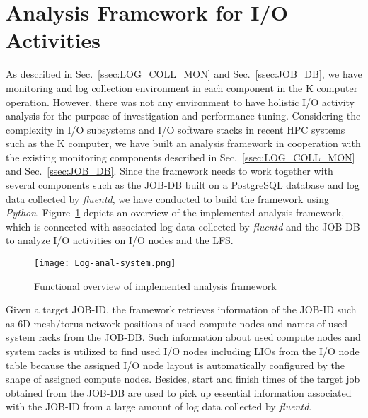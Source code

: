 \documentclass{jhps}
\begin{document}
\section{Analysis Framework for I/O Activities}
\label{sec:ANAL_SYS}

As described in Sec.~\ref{ssec:LOG_COLL_MON} and Sec.~\ref{ssec:JOB_DB},
we have monitoring and log collection environment in each component
in the K computer operation.
However, there was not any environment to have holistic I/O activity analysis
for the purpose of investigation and performance tuning.
Considering the complexity in I/O subsystems and I/O software stacks
in recent HPC systems such as the K computer,
we have built an analysis framework in cooperation with
the existing monitoring components described in
Sec.~\ref{ssec:LOG_COLL_MON} and Sec.~\ref{ssec:JOB_DB}.
Since the framework needs to work together with several components
such as the JOB-DB built on a PostgreSQL database and log data collected by {\itshape fluentd},
we have conducted to build the framework using {\itshape Python}.
Figure~\ref{fig:LOG_ANAL_SYS} depicts an overview of the implemented analysis framework,
which is connected with associated log data collected by {\itshape fluentd}
and the JOB-DB to analyze I/O activities on I/O nodes and the LFS.
%
\begin{figure}[tb]
\centering
\texttt{[image: Log-anal-system.png]}
\caption{Functional overview of implemented analysis framework}
\label{fig:LOG_ANAL_SYS}
\end{figure}
%
Given a target JOB-ID, the framework retrieves information of the JOB-ID
such as 6D mesh/torus network positions of used compute nodes and names of
used system racks from the JOB-DB.
Such information about used compute nodes and system racks is utilized
to find used I/O nodes including LIOs from the I/O node table
because the assigned I/O node layout is automatically configured
by the shape of assigned compute nodes.
Besides, start and finish times of the target job obtained from the JOB-DB
are used to pick up essential information associated with the JOB-ID
from a large amount of log data collected by {\itshape fluentd}.
\end{document}
